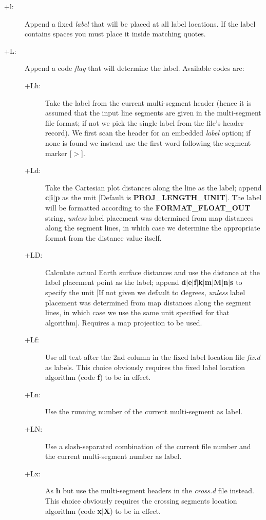 \begin{description}
\item [+l:] Append a fixed \emph{label} that will be placed at all label locations.  If the label contains
spaces you must place it inside matching quotes.
\item [+L:] Append a code \emph{flag} that will determine the label.  Available codes are:
\begin{description}
\item [+Lh:]  Take the label from the current multi-segment header (hence it is assumed that the
input line segments are given in the multi-segment file format; if not we pick the single label
from the file's header record).  We first scan the header for an embedded
\emph{label} option; if none is found we instead use the first word following the segment marker [$>$].
\item [+Ld:] Take the Cartesian plot distances along the line as the label; append \textbf{c$|$i$|$p}
as the unit [Default is \textbf{PROJ\_LENGTH\_UNIT}].  The label will be formatted according to the \textbf{FORMAT\_FLOAT\_OUT}
string, \emph{unless} label placement was determined from map distances along the segment lines, in which
case we determine the appropriate format from the distance value itself. 
\item [+LD:]  Calculate actual Earth surface distances and use the distance at the label placement point as
the label; append \textbf{d$|$e$|$f$|$k$|$m$|$M$|$n$|$s} to specify the unit [If not given we default to \textbf{d}egrees,
\emph{unless} label placement was determined from map distances along the segment lines, in which case we
use the same unit specified for that algorithm].  Requires a map projection to be used.
\item [+Lf:]  Use all text after the 2nd column in the fixed label location file \emph{fix.d} as labels.
This choice obviously requires the fixed label location algorithm (code \textbf{f}) to be in effect.
\item [+Ln:]  Use the running number of the current multi-segment as label.
\item [+LN:]  Use a slash-separated combination of the current file number and the current multi-segment number as label.
\item [+Lx:]  As \textbf{h} but use the multi-segment headers in the \emph{cross.d} file instead.
This choice obviously requires the crossing segments location algorithm (code \textbf{x$|$X}) to be in effect.
\end{description}
\end{description}

